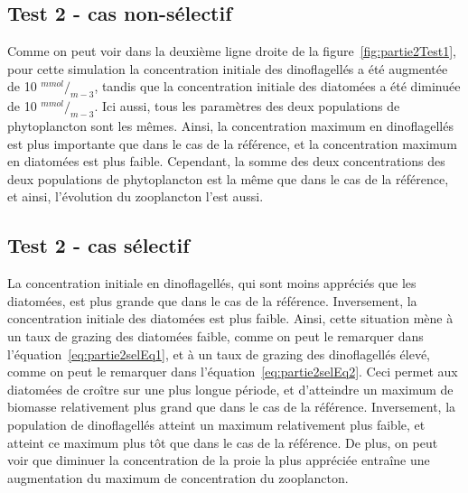 \subsection{Test 2 - cas non-sélectif}
\par{
Comme on peut voir dans la deuxième ligne droite de la figure~\ref{fig:partie2Test1}, pour cette simulation
la concentration initiale des dinoflagellés a été augmentée de 10 ${^{mmol}}/_{m-3}$, tandis que la
concentration initiale des diatomées a été diminuée de 10 ${^{mmol}}/_{m-3}$. Ici aussi, tous les
paramètres des deux populations de phytoplancton sont les mêmes. Ainsi, la concentration maximum
en dinoflagellés est plus importante que dans le cas de la référence, et la concentration maximum en
diatomées est plus faible. Cependant, la somme des deux concentrations des deux populations de phytoplancton
est la même que dans le cas de la référence, et ainsi, l'évolution du zooplancton l'est aussi.
}
\subsection{Test 2 - cas sélectif}
\par{
La concentration initiale en dinoflagellés, qui sont moins appréciés que les diatomées, est plus grande
que dans le cas de la référence. Inversement, la concentration initiale des diatomées est plus faible.
Ainsi, cette situation mène à un taux de grazing des diatomées faible, comme on peut le remarquer dans
l'équation~\ref{eq:partie2selEq1}, et à un taux de grazing des dinoflagellés élevé, comme on peut le
remarquer dans l'équation~\ref{eq:partie2selEq2}. Ceci permet aux diatomées de croître sur une plus
longue période, et d'atteindre un maximum de biomasse relativement plus grand que dans le cas de la
référence. Inversement, la population de dinoflagellés atteint un maximum relativement plus faible,
et atteint ce maximum plus tôt que dans le cas de la référence. De plus, on peut voir que diminuer
la concentration de la proie la plus appréciée entraîne une augmentation du maximum de concentration
du zooplancton.
}

